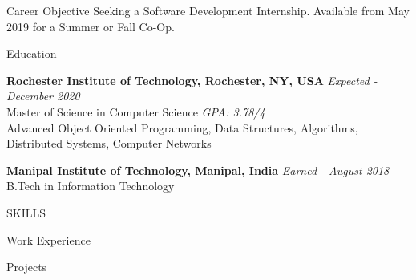 \documentclass{resume} %
\begin{document}
    \begin{rSection}{Career Objective}
     Seeking a Software Development Internship. Available from May 2019 for a Summer or Fall Co-Op.
    \end{rSection}

    \begin{rSection}{Education}
    
        {\bf Rochester Institute of Technology, Rochester, NY, USA} \hfill {\em Expected - December 2020} 
        \\ Master of Science in Computer Science 
        \hfill {\em GPA: 3.78/4} \\
        Advanced Object Oriented Programming, Data Structures, Algorithms, Distributed Systems, Computer Networks
        
        {\bf Manipal Institute of Technology, Manipal, India} 
        \hfill {\em Earned - August 2018} 
        \\ B.Tech in Information Technology
    \end{rSection}



    \begin{rSection}{SKILLS}
        
    \end{rSection}


    \begin{rSection}{Work Experience}
        
        
        
    \end{rSection}


    \begin{rSection}{Projects}
        
        
        
    \end{rSection}
\end{document}
